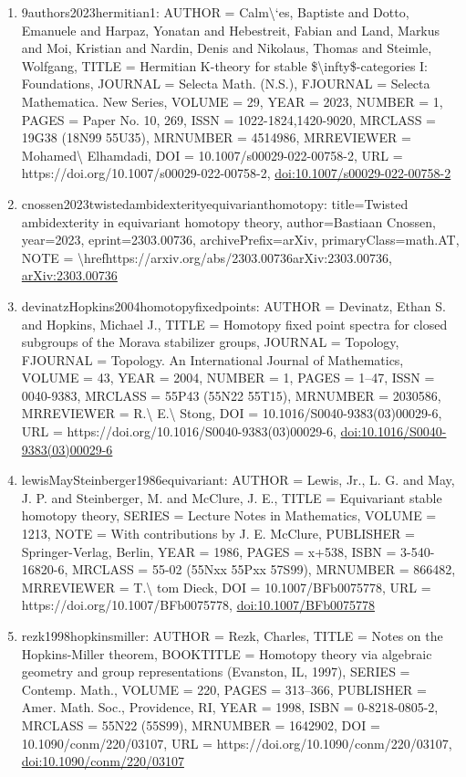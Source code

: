 \documentclass[11pt]{article}
\begin{document}
\begin{enumerate}[leftmargin=*]
  \item 9authors2023hermitian1: AUTHOR = Calm\textbackslash{}`es, Baptiste and Dotto, Emanuele and Harpaz, Yonatan and Hebestreit, Fabian and Land, Markus and Moi, Kristian and Nardin, Denis and Nikolaus, Thomas and Steimle, Wolfgang, TITLE = Hermitian K-theory for stable \$\textbackslash{}infty\$-categories I: Foundations, JOURNAL = Selecta Math. (N.S.), FJOURNAL = Selecta Mathematica. New Series, VOLUME = 29, YEAR = 2023, NUMBER = 1, PAGES = Paper No. 10, 269, ISSN = 1022-1824,1420-9020, MRCLASS = 19G38 (18N99 55U35), MRNUMBER = 4514986, MRREVIEWER = Mohamed\textbackslash{} Elhamdadi, DOI = 10.1007/s00029-022-00758-2, URL = https://doi.org/10.1007/s00029-022-00758-2, \href{https://doi.org/10.1007/s00029-022-00758-2}{doi:10.1007/s00029-022-00758-2}
  \item cnossen2023twistedambidexterityequivarianthomotopy: title=Twisted ambidexterity in equivariant homotopy theory, author=Bastiaan Cnossen, year=2023, eprint=2303.00736, archivePrefix=arXiv, primaryClass=math.AT, NOTE = \textbackslash{}hrefhttps://arxiv.org/abs/2303.00736arXiv:2303.00736, \href{https://arxiv.org/abs/2303.00736}{arXiv:2303.00736}
  \item devinatzHopkins2004homotopyfixedpoints: AUTHOR = Devinatz, Ethan S. and Hopkins, Michael J., TITLE = Homotopy fixed point spectra for closed subgroups of the Morava stabilizer groups, JOURNAL = Topology, FJOURNAL = Topology. An International Journal of Mathematics, VOLUME = 43, YEAR = 2004, NUMBER = 1, PAGES = 1--47, ISSN = 0040-9383, MRCLASS = 55P43 (55N22 55T15), MRNUMBER = 2030586, MRREVIEWER = R.\textbackslash{} E.\textbackslash{} Stong, DOI = 10.1016/S0040-9383(03)00029-6, URL = https://doi.org/10.1016/S0040-9383(03)00029-6, \href{https://doi.org/10.1016/S0040-9383(03)00029-6}{doi:10.1016/S0040-9383(03)00029-6}
  \item lewisMaySteinberger1986equivariant: AUTHOR = Lewis, Jr., L. G. and May, J. P. and Steinberger, M. and McClure, J. E., TITLE = Equivariant stable homotopy theory, SERIES = Lecture Notes in Mathematics, VOLUME = 1213, NOTE = With contributions by J. E. McClure, PUBLISHER = Springer-Verlag, Berlin, YEAR = 1986, PAGES = x+538, ISBN = 3-540-16820-6, MRCLASS = 55-02 (55Nxx 55Pxx 57S99), MRNUMBER = 866482, MRREVIEWER = T.\textbackslash{} tom Dieck, DOI = 10.1007/BFb0075778, URL = https://doi.org/10.1007/BFb0075778, \href{https://doi.org/10.1007/BFb0075778}{doi:10.1007/BFb0075778}
  \item rezk1998hopkinsmiller: AUTHOR = Rezk, Charles, TITLE = Notes on the Hopkins-Miller theorem, BOOKTITLE = Homotopy theory via algebraic geometry and group representations (Evanston, IL, 1997), SERIES = Contemp. Math., VOLUME = 220, PAGES = 313--366, PUBLISHER = Amer. Math. Soc., Providence, RI, YEAR = 1998, ISBN = 0-8218-0805-2, MRCLASS = 55N22 (55S99), MRNUMBER = 1642902, DOI = 10.1090/conm/220/03107, URL = https://doi.org/10.1090/conm/220/03107, \href{https://doi.org/10.1090/conm/220/03107}{doi:10.1090/conm/220/03107}

\end{enumerate}
\end{document}
